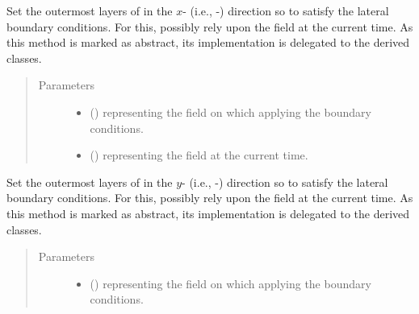 \documentclass[letterpaper,10pt,english]{sphinxmanual}
\begin{document}
\begin{fulllineitems}
\begin{fulllineitems}
\label{\detokenize{api:dycore.horizontal_boundary.HorizontalBoundary.set_outermost_layers_x}}
Set the outermost layers of  in the \(x\)- (i.e., -) direction so to satisfy
the lateral boundary conditions. For this, possibly rely upon the field  at the current time.
As this method is marked as abstract, its implementation is delegated to the derived classes.
\begin{quote}\begin{description}
\item[{Parameters}] \leavevmode\begin{itemize}
\item {} 
 () \textendash{}  representing the field on which applying the boundary conditions.

\item {} 
 () \textendash{}  representing the field at the current time.

\end{itemize}

\end{description}\end{quote}

\end{fulllineitems}


\begin{fulllineitems}
\label{\detokenize{api:dycore.horizontal_boundary.HorizontalBoundary.set_outermost_layers_y}}
Set the outermost layers of  in the \(y\)- (i.e., -) direction so to satisfy
the lateral boundary conditions. For this, possibly rely upon the field  at the current time.
As this method is marked as abstract, its implementation is delegated to the derived classes.
\begin{quote}\begin{description}
\item[{Parameters}] \leavevmode\begin{itemize}
\item {} 
 () \textendash{}  representing the field on which applying the boundary conditions.


\end{itemize}
\end{description}
\end{quote}
\end{fulllineitems}
\end{fulllineitems}
\end{document}
